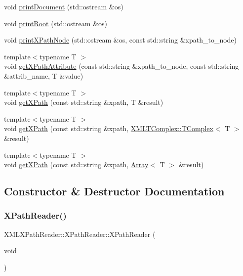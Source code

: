 \begin{DoxyCompactItemize}
void \mbox{\hyperlink{classXMLXPathReader_1_1XPathReader_a5505bd1ad902828907e2562947719fef}{print\+Document}} (std\+::ostream \&os)
\item 
void \mbox{\hyperlink{classXMLXPathReader_1_1XPathReader_a9634a8955fc1b2c8bc086b95f7fa2c1f}{print\+Root}} (std\+::ostream \&os)
\item 
void \mbox{\hyperlink{classXMLXPathReader_1_1XPathReader_a8f751fb071319179252a48075239559c}{print\+X\+Path\+Node}} (std\+::ostream \&os, const std\+::string \&xpath\+\_\+to\+\_\+node)
\item 
{\footnotesize template$<$typename T $>$ }\\void \mbox{\hyperlink{classXMLXPathReader_1_1XPathReader_a0a5ca67826c2c8fdad784a3bbbba4b3c}{get\+X\+Path\+Attribute}} (const std\+::string \&xpath\+\_\+to\+\_\+node, const std\+::string \&attrib\+\_\+name, T \&value)
\item 
{\footnotesize template$<$typename T $>$ }\\void \mbox{\hyperlink{classXMLXPathReader_1_1XPathReader_abbd673bc00e75502126b2cca246ff6f4}{get\+X\+Path}} (const std\+::string \&xpath, T \&result)
\item 
{\footnotesize template$<$typename T $>$ }\\void \mbox{\hyperlink{classXMLXPathReader_1_1XPathReader_a82579390a7b37879a7a7d9b79934a592}{get\+X\+Path}} (const std\+::string \&xpath, \mbox{\hyperlink{classXMLTComplex_1_1TComplex}{X\+M\+L\+T\+Complex\+::\+T\+Complex}}$<$ T $>$ \&result)
\item 
{\footnotesize template$<$typename T $>$ }\\void \mbox{\hyperlink{classXMLXPathReader_1_1XPathReader_a2c16b804ab7842a5bab7a8fe3f433437}{get\+X\+Path}} (const std\+::string \&xpath, \mbox{\hyperlink{classXMLArray_1_1Array}{Array}}$<$ T $>$ \&result)
\end{DoxyCompactItemize}


\subsection{Constructor \& Destructor Documentation}
\mbox{\label{classXMLXPathReader_1_1XPathReader_a0f0a3151a7ee18a11d031841dd1aceca}} 
\subsubsection{\texorpdfstring{XPathReader()}{XPathReader()}\hspace{0.1cm}{\footnotesize\ttfamily [1/12]}}
{\footnotesize\ttfamily X\+M\+L\+X\+Path\+Reader\+::\+X\+Path\+Reader\+::\+X\+Path\+Reader (\begin{DoxyParamCaption}\item[{void}]{ }\end{DoxyParamCaption})\hspace{0.3cm}{\ttfamily [inline]}}

